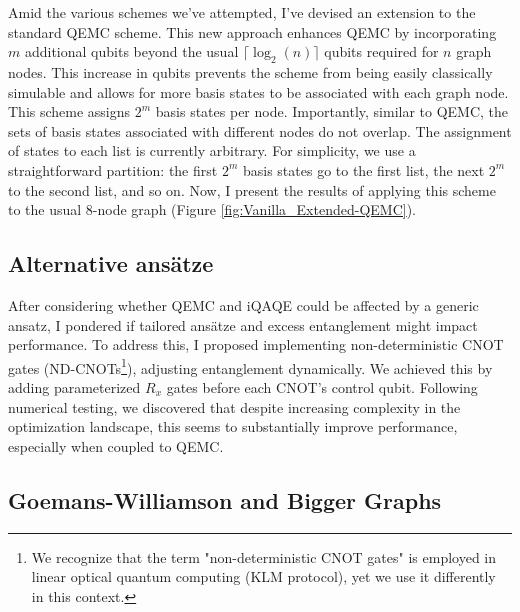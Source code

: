 Amid the various schemes we've attempted, I've devised an extension to the standard QEMC scheme. This new approach enhances QEMC by incorporating $m$ additional qubits beyond the usual $\lceil\log_2(n)\rceil$ qubits required for $n$ graph nodes. This increase in qubits prevents the scheme from being easily classically simulable and allows for more basis states to be associated with each graph node. This scheme assigns $2^m$ basis states per node. Importantly, similar to QEMC, the sets of basis states associated with different nodes do not overlap. The assignment of states to each list is currently arbitrary. For simplicity, we use a straightforward partition: the first $2^m$ basis states go to the first list, the next $2^m$ to the second list, and so on. Now, I present the results of applying this scheme to the usual $8$-node graph (Figure \ref{fig:Vanilla_Extended-QEMC}).

\subsection{Alternative ansätze}
\label{subsection:Alternative_Ansätze}
After considering whether QEMC and iQAQE could be affected by a generic ansatz, I pondered if tailored ansätze and excess entanglement might impact performance. To address this, I proposed implementing non-deterministic CNOT gates (ND-CNOTs\footnote{We recognize that the term "non-deterministic CNOT gates" is employed in linear optical quantum computing (KLM protocol), yet we use it differently in this context.}), adjusting entanglement dynamically. We achieved this by adding parameterized $R_x$ gates before each CNOT's control qubit. Following numerical testing, we discovered that despite increasing complexity in the optimization landscape, this seems to substantially improve performance, especially when coupled to QEMC.

\subsection{Goemans-Williamson and Bigger Graphs}
\label{subsection:GW_Bigger_Graphs}

